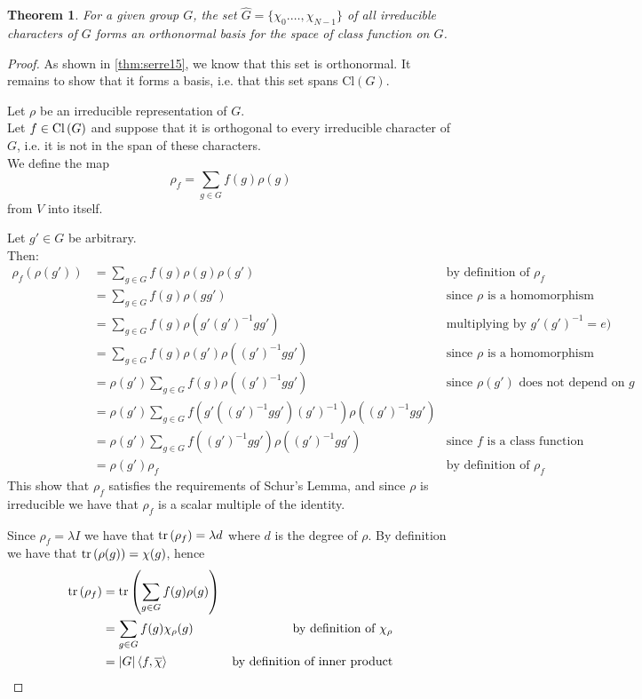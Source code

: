 \documentclass{article}
\theoremstyle{plain}
\newtheorem{theorem}{Theorem}
\theoremstyle{centered}
\newcommand{\abs}[1]{\left\lvert #1 \right\rvert}
\newcommand{\inner}[2]{\left\langle #1, #2 \right\rangle}
\newcommand{\tr}[1]{\textnormal{tr}\left(#1\right)}
\newcommand{\conj}[1]{\overline{#1}}
\newcommand{\Cl}[1]{\textnormal{Cl}\left(#1\right)}
\begin{document}
        \begin{theorem}\label{thm:irr_characters}
            For a given group $G$, the set $\hat{G} = \{\chi_0. \dots, \chi_{N-1}\}$ of all irreducible characters of $G$ forms an orthonormal basis for the space of class function on $G$.
        \end{theorem}
        \begin{proof}
            As shown in \cref{thm:serre15}, we know that this set is orthonormal. It remains to show that it forms a basis, i.e. that this set spans $\text{Cl}(G)$.

            Let $\rho$ be an irreducible representation of $G$.\\
            Let $f \in \Cl{G}$ and suppose that it is orthogonal to every irreducible character of $G$, i.e. it is not in the span of these characters.\\
            We define the map 
                $$\rho_f = \sum_{g \in G} f(g) \rho(g)$$
            from $V$ into itself.

            Let $g' \in G$ be arbitrary.\\
            Then:
            \begin{align*}
            \rho_f(\rho(g')) &= \sum_{g \in G} f(g) \rho(g) \rho(g') & \text{by definition of $\rho_f$}\\
            &= \sum_{g \in G} f(g) \rho(gg') & \text{since $\rho$ is a homomorphism}\\
            &= \sum_{g \in G} f(g) \rho(g'(g')^{-1} g g') & \text{multiplying by $g'(g')^{-1} = e)$}\\
            &= \sum_{g \in G} f(g) \rho(g') \rho((g')^{-1} g g') & \text{since $\rho$ is a homomorphism}\\
            &= \rho(g') \sum_{g \in G} f(g) \rho((g')^{-1} g g') & \text{since $\rho(g')$ does not depend on $g$}\\
            &= \rho(g') \sum_{g \in G} f(g' ((g')^{-1} g g') (g')^{-1}) \rho((g')^{-1} g g')\\
            &= \rho(g') \sum_{g \in G} f((g')^{-1} g g') \rho((g')^{-1} g g') & \text{since $f$ is a class function}\\
            &= \rho(g') \rho_f & \text{by definition of $\rho_f$}
            \end{align*}
            This show that $\rho_f$ satisfies the requirements of Schur's Lemma, and since $\rho$ is irreducible we have that $\rho_f$ is a scalar multiple of the identity.

            Since $\rho_f = \lambda I$ we have that $\tr{\rho_f} = \lambda d$ where $d$ is the degree of $\rho$.
            By definition we have that $\tr{\rho(g)} = \chi(g)$, hence
            \begin{align*}
            \tr{\rho_f} &= \tr{\sum_{g \in G} f(g) \rho(g)}\\
            &= \sum_{g \in G} f(g) \chi_{\rho}(g) & \text{by definition of $\chi_\rho$}\\
            &= \abs{G}\inner{f}{\conj{\chi}} &\text{by definition of inner product}
            \end{align*}


\end{proof}
\end{document}
